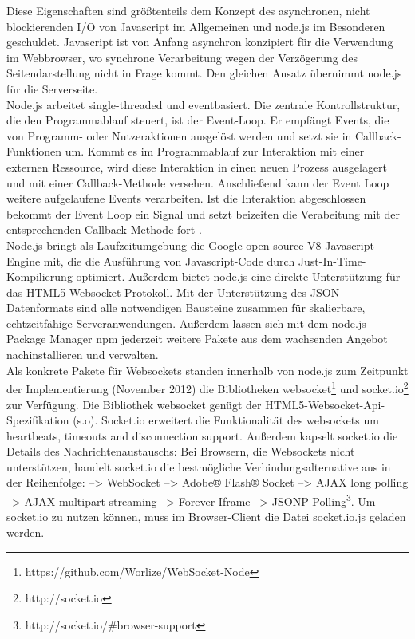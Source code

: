 Diese Eigenschaften sind größtenteils dem Konzept des asynchronen, nicht blockierenden I/O von Javascript im Allgemeinen und node.js im Besonderen geschuldet.
Javascript ist von Anfang asynchron konzipiert für die Verwendung im Webbrowser, wo synchrone Verarbeitung wegen der Verzögerung des Seitendarstellung nicht in Frage kommt. Den gleichen Ansatz übernimmt node.js für die Serverseite.
\\
Node.js arbeitet single-threaded und eventbasiert. Die zentrale Kontrollstruktur, die den Programmablauf steuert, ist der Event-Loop. Er empfängt Events, die von Programm- oder Nutzeraktionen ausgelöst werden und setzt sie in Callback-Funktionen um.
Kommt es im Programmablauf zur Interaktion mit einer externen Ressource, wird diese Interaktion in einen neuen Prozess ausgelagert und mit einer Callback-Methode versehen. Anschließend kann der Event Loop weitere aufgelaufene Events verarbeiten. Ist die Interaktion abgeschlossen bekommt der Event Loop ein Signal und setzt beizeiten die Verabeitung mit der entsprechenden Callback-Methode  fort \cite{teixeira}.\\
Node.js bringt als Laufzeitumgebung die Google open source V8-Javascript-Engine mit, die die Ausführung von Javascript-Code durch Just-In-Time-Kompilierung optimiert. Außerdem bietet node.js eine direkte Unterstützung für das HTML5-Websocket-Protokoll. Mit der Unterstützung des JSON-Datenformats sind alle notwendigen Bausteine zusammen für skalierbare, echtzeitfähige Serveranwendungen.
Außerdem lassen sich mit dem node.js Package Manager npm jederzeit weitere Pakete aus dem wachsenden Angebot nachinstallieren und verwalten.\\
Als konkrete Pakete für Websockets standen innerhalb von node.js zum Zeitpunkt der Implementierung (November 2012) die Bibliotheken websocket\footnote{https://github.com/Worlize/WebSocket-Node} und socket.io\footnote{http://socket.io} zur Verfügung. Die Bibliothek websocket genügt der HTML5-Websocket-Api-Spezifikation (s.o). Socket.io erweitert die Funktionalität des websockets um heartbeats, timeouts and disconnection support. Außerdem kapselt socket.io die Details des Nachrichtenaustauschs: Bei Browsern, die Websockets nicht unterstützen, handelt socket.io die bestmögliche Verbindungsalternative aus in der Reihenfolge: 
-->    WebSocket 
 -->   Adobe® Flash® Socket
  -->  AJAX long polling
   --> AJAX multipart streaming
 -->   Forever Iframe
 -->   JSONP Polling\footnote{http://socket.io/\#browser-support}.
Um socket.io zu nutzen können, muss im Browser-Client die Datei socket.io.js geladen werden.
